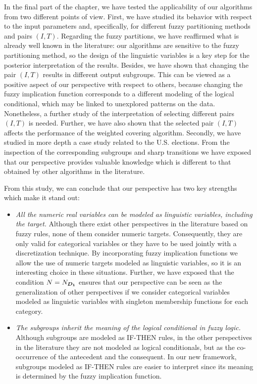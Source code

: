 In the final part of the chapter, we have tested the applicability of our algorithms from two different points of view. 
First, we have studied its behavior with respect to the input parameters and, specifically, for different fuzzy partitioning methods and pairs $(I,T)$. Regarding the fuzzy partitions, we have reaffirmed what is already well known in the literature: our algorithms are sensitive to the fuzzy partitioning method, so the design of the linguistic variables is a key step for the posterior interpretation of the results. Besides, we have shown that changing the pair $(I,T)$ results in different output subgroups. This can be viewed as a positive aspect of our perspective with respect to others, because changing the fuzzy implication function corresponds to a different modeling of the logical conditional, which may be linked to unexplored patterns on the data. Nonetheless, a further study of the interpretation of selecting different pairs $(I,T)$ is needed. Further, we have also shown that the selected pair $(I,T)$ affects the performance of the weighted covering algorithm.
Secondly, we have studied in more depth a case study related to the U.S. elections. From the inspection of the corresponding subgroups and sharp transitions we have exposed that our perspective provides valuable knowledge which is different to that obtained by other algorithms in the literature.  

From this study, we can conclude that our perspective has two key strengths which make it stand out:
\begin{itemize}
	\item \textit{All the numeric real variables can be modeled as linguistic variables, including the target.} Although there exist other perspectives in the literature based on fuzzy rules, none of them consider numeric targets. Consequently, they are only valid for categorical variables or they have to be used jointly with a discretization technique. By incorporating fuzzy implication functions we allow the use of numeric targets modeled as linguistic variables, so it is an interesting choice in these situations. Further, we have exposed that the condition $N=N_{\bm{D_1}}$ ensures that our perspective can be seen as the generalization of other perspectives if we consider categorical variables modeled as linguistic variables with singleton membership functions for each category.
	\item \textit{The subgroups inherit the meaning of the logical conditional in fuzzy logic.} Although subgroups are modeled as IF-THEN rules, in the other perspectives in the literature they are not modeled as logical conditionals, but as the co-occurrence of the antecedent and the consequent. In our new framework, subgroups modeled as IF-THEN rules are easier to interpret since its meaning is determined by the fuzzy implication function.
\end{itemize}

